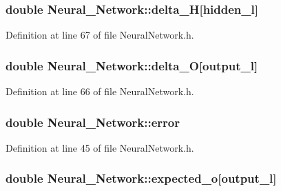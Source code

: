 \hypertarget{a00003_a51e5c2d2b53ba284c5b3791446c3b7d8}{
\subsubsection[{delta\-\_\-\-H}]{\setlength{\rightskip}{0pt plus 5cm}double Neural\-\_\-\-Network\-::delta\-\_\-\-H\mbox{[}{\bf hidden\-\_\-l}\mbox{]}\hspace{0.3cm}{\ttfamily [private]}}}\label{d1/d7c/a00003_a51e5c2d2b53ba284c5b3791446c3b7d8}


Definition at line 67 of file Neural\-Network.\-h.

\hypertarget{a00003_ae5f829ba5e65ae91d5c4feda5f66e37a}{
\subsubsection[{delta\-\_\-\-O}]{\setlength{\rightskip}{0pt plus 5cm}double Neural\-\_\-\-Network\-::delta\-\_\-\-O\mbox{[}{\bf output\-\_\-l}\mbox{]}\hspace{0.3cm}{\ttfamily [private]}}}\label{d1/d7c/a00003_ae5f829ba5e65ae91d5c4feda5f66e37a}


Definition at line 66 of file Neural\-Network.\-h.

\hypertarget{a00003_a2ffe42aee798e268d4bbf0f3428ba430}{
\subsubsection[{error}]{\setlength{\rightskip}{0pt plus 5cm}double Neural\-\_\-\-Network\-::error\hspace{0.3cm}{\ttfamily [private]}}}\label{d1/d7c/a00003_a2ffe42aee798e268d4bbf0f3428ba430}


Definition at line 45 of file Neural\-Network.\-h.

\hypertarget{a00003_a8d632cf69d2fcd076e473aba1ae74702}{
\subsubsection[{expected\-\_\-o}]{\setlength{\rightskip}{0pt plus 5cm}double Neural\-\_\-\-Network\-::expected\-\_\-o\mbox{[}{\bf output\-\_\-l}\mbox{]}\hspace{0.3cm}{\ttfamily [private]}}}\label{d1/d7c/a00003_a8d632cf69d2fcd076e473aba1ae74702}


